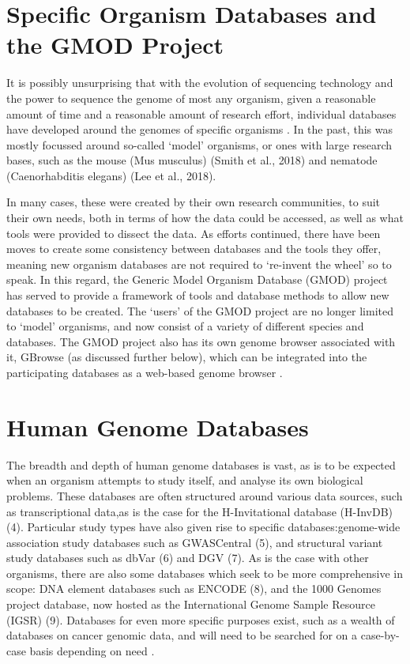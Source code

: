 \section{Specific Organism Databases and the GMOD Project} 
It is possibly unsurprising that with the evolution of sequencing technology and the power to sequence the genome of most any organism, given a reasonable amount of time and a reasonable amount of research effort, individual databases have developed around the genomes of specific organisms \cite{ranganathan2018encyclopedia}. In the past, this was mostly focussed around so-called ‘model’ organisms, or ones with large research bases, such as the mouse (Mus musculus) (Smith et al., 2018) and nematode (Caenorhabditis elegans) (Lee et al., 2018).

In many cases, these were created by their own research communities, to suit their own needs, both in terms of how the data could be accessed, as well as what tools were provided to dissect the data. As efforts continued, there have been moves to create some consistency between databases and the tools they offer, meaning new organism databases are not required to ‘re-invent the wheel’ so to speak. In this regard, the Generic Model Organism Database (GMOD) project has served to provide a framework of tools and database methods to allow new databases to be created. The ‘users’ of the GMOD project are no longer limited to ‘model’ organisms, and now consist of a variety of different species and databases. The GMOD project also has its own genome browser associated with it, GBrowse (as discussed further below), which can be integrated into the participating databases as a web-based genome browser \cite{ranganathan2018encyclopedia}.


\section{Human Genome Databases}
The breadth and depth of human genome databases is vast, as is to be expected when an organism attempts to study itself, and
analyse its own biological problems. These databases are often structured around various data sources, such as transcriptional data,as is the case for the H-Invitational database (H-InvDB) (4). Particular study types have also given rise to specific databases:genome-wide association study databases such as GWASCentral (5), and structural variant study databases such as dbVar (6) and DGV (7). As is the case with other organisms, there are also some databases which seek to be more comprehensive in scope: DNA element databases such as ENCODE (8), and the 1000 Genomes project database, now hosted as the International Genome Sample Resource (IGSR) (9). Databases for even more specific purposes exist, such as a wealth of databases on cancer genomic data, and will need to be searched for on a case-by-case basis depending on need \cite{jones2004introduction}.


